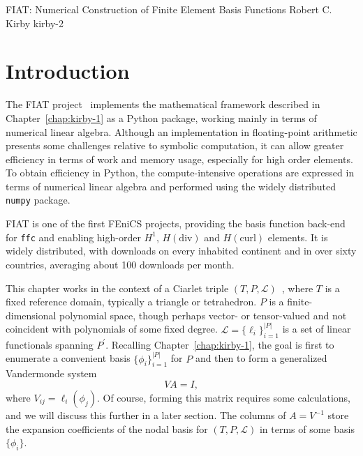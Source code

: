               {FIAT: Numerical Construction of Finite Element Basis Functions}
              {Robert C. Kirby}
              {kirby-2}

\section{Introduction}

The FIAT project~\citep{Kirby2004,Kirby2006} implements the mathematical
framework described in Chapter~\ref{chap:kirby-1} as a Python package,
working mainly in terms of numerical linear algebra.  Although an
implementation in floating-point arithmetic presents some challenges
relative to symbolic computation, it can allow greater efficiency in
terms of work and memory usage, especially for high order elements.
To obtain efficiency in Python, the compute-intensive operations are
expressed in terms of numerical linear algebra and performed using the
widely distributed \texttt{numpy} package.

FIAT is one of the first FEniCS projects, providing the basis function
back-end for \texttt{ffc} and enabling high-order \( H^1 \), \(
H(\mathrm{div}) \) and \( H(\mathrm{curl}) \) elements. It is widely
distributed, with downloads on every inhabited continent and in over
sixty countries, averaging about 100 downloads per month.

This chapter works in the context of a Ciarlet triple \( (T,P,\mathcal{L})
\)~\citep{Ciarlet2002}, where \( T \) is a fixed reference domain,
typically a triangle or tetrahedron.  \( P \) is a finite-dimensional
polynomial space, though perhaps vector- or tensor-valued and not
coincident with polynomials of some fixed degree.  \( \mathcal{L} =
\{ \ell_i \}_{i=1}^{|P|} \) is a set of linear functionals spanning \(
P^\prime \).  Recalling Chapter~\ref{chap:kirby-1}, the goal is first
to enumerate a convenient basis \( \{ \phi_i \}_{i=1}^{|P|} \) for \(
P \) and then to form a generalized Vandermonde system
\begin{equation}
  V A = I,
\end{equation}
where \( V_{ij} = \ell_i( \phi_j) \).  Of course, forming this matrix
requires some calculations, and we will discuss this further in a later
section.  The columns of \( A = V^{-1} \) store the expansion coefficients
of the nodal basis for \( (T,P,\mathcal{L}) \) in terms of some basis \(
\{ \phi_i \} \).


